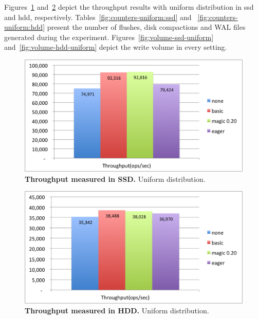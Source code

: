 Figures~\ref{fig:throughput-ssd-uniform} and~\ref{fig:throughput-hdd-uniform} depict the throughput results with uniform distribution in ssd and hdd, respectively.
Tables~\ref{fig:counters-uniform:ssd} and ~\ref{fig:counters-uniform:hdd} present the number of flushes, disk compactions and WAL files generated during the experiment.
Figures~\ref{fig:volume-ssd-uniform} and~\ref{fig:volume-hdd-uniform} depict the write volume in every setting. 


\begin{figure}[htb]
\includegraphics[width=\figw]{Figs/throughput-ssd-uniform.png}
\caption{{\bf  Throughput measured in SSD.} Uniform distribution.
}
\label{fig:throughput-ssd-uniform}
\end{figure}

\begin{figure}[htb]
\includegraphics[width=\figw]{Figs/throughput-hdd-uniform.png}
\caption{{\bf  Throughput measured in HDD.} Uniform distribution. 
}
\label{fig:throughput-hdd-uniform}
\end{figure}


